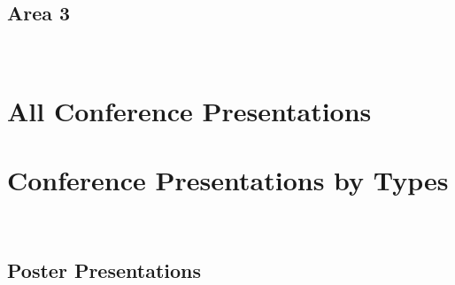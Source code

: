 	\subsection{Area 3}\hfill\\
	\printbibliography[subtype=area3]

	\section{All Conference Presentations}  %
	\printbibliography[type=inproceedings]  %

	\section{Conference Presentations by Types}  %
	\hfill\\
	\printbibliography[subtype=oral]

	\subsection{Poster Presentations}\hfill\\
	\printbibliography[subtype=poster]

